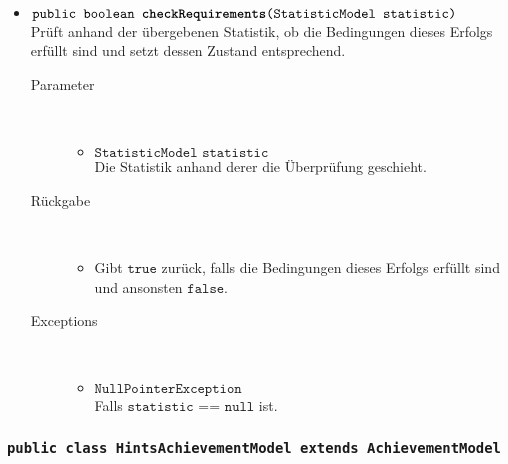 \begin{description}
\begin{itemize}
		\item $\texttt{public boolean \textbf{checkRequirements}(StatisticModel statistic)}$ \\ Prüft anhand der übergebenen Statistik, ob die Bedingungen dieses Erfolgs erfüllt sind und setzt dessen Zustand entsprechend.
		\begin{description}
		\item[Parameter] \hfill \\
			\vspace{-.8cm}
			\begin{itemize}
				\item $\texttt{StatisticModel statistic}$ \\ Die Statistik anhand derer die Überprüfung geschieht. 
			\end{itemize}
			\item[Rückgabe] \hfill \\
			\vspace{-.8cm}
			\begin{itemize}
				\item Gibt $\texttt{true}$ zurück, falls die Bedingungen dieses Erfolgs erfüllt sind und ansonsten $\texttt{false}$.
			\end{itemize}
			\item[Exceptions] \hfill \\
			\vspace{-.8cm}
			\begin{itemize}
				\item $\texttt{NullPointerException}$ \\ Falls $\texttt{statistic == null}$ ist.
			\end{itemize}
		\end{description}
		
	\end{itemize}
\end{description}

\subsubsection{\normalfont \texttt{public class \textbf{HintsAchievementModel} extends AchievementModel}}

